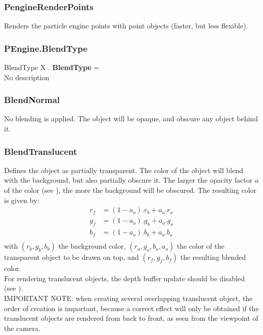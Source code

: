 \subsubsection{PengineRenderPoints \label{T:PEngineRenderType|PengineRenderPoints}}
Renders the particle engine points with point objects (faster, but less flexible).

\subsubsection{PEngine.BlendType \label{F:PEngine:BlendType}}
BlendType X . \textbf{BlendType} = \\
No description

\subsubsection{BlendNormal \label{T:BlendType|BlendNormal}}
No blending is applied. The object will be opaque, and obscure any object behind it.

\subsubsection{BlendTranslucent \label{T:BlendType|BlendTranslucent}}
Defines the object as partially transparent. The color of the object will blend with the background, but also partially obscure it. The larger the opacity factor $a$ of the color (see ), the more the background will be obscured. The resulting color is given by:
\begin{equation}
\begin{array}{rcl}
r_f & = (1-a_o) . r_b + a_o . r_o \\
g_f & = (1-a_o) . g_b + a_o . g_o \\
b_f & = (1-a_o) . b_b + a_o . b_o \\
\end{array}
\end{equation}
with $(r_b,g_b,b_b)$ the background color, $(r_o,g_o,b_o,a_o)$ the color of the transparent object to be drawn on top, and $(r_f,g_f,b_f)$ the resulting blended color. \\
For rendering translucent objects, the depth buffer update should be disabled (see ). \\
IMPORTANT NOTE: when creating several overlapping translucent object, the order of creation is important, because a correct effect will only be obtained if the translucent objects are rendered from back to front, as seen from the viewpoint of the camera.

